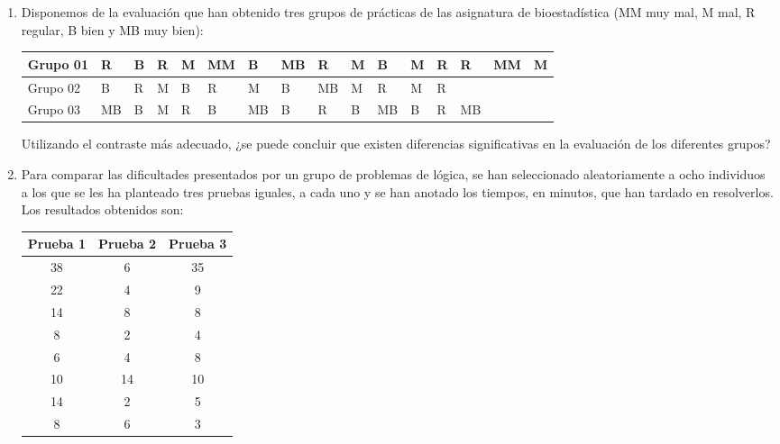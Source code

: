 \begin{description}
\begin{enumerate}[leftmargin=*]
\begin{enumerate}
\item Disponemos de la evaluación que han obtenido tres grupos de prácticas de las asignatura de bioestadística (MM muy mal, M mal, R regular, B bien y MB muy bien):

\begin{center}
\begin{tabular}{|l|l|l|l|l|l|l|l|l|l|l|l|l|l|l|l|}
\hline
Grupo 01 & R & B & R & M & MM & B & MB & R & M & B & M & R & R & MM & M\\
\hline
Grupo 02 & B & R & M & B & R & M & B & MB & M & R & M & R & & &  \\
\hline
Grupo 03 & MB & B & M & R & B & MB & B & R & B & MB & B & R & MB & &  \\
\hline
\end{tabular}
\end{center}

Utilizando el contraste más adecuado, ¿se puede concluir que existen diferencias significativas en la evaluación de los diferentes grupos?


\item Para comparar las dificultades presentados por un grupo de problemas de lógica, se han seleccionado aleatoriamente a ocho individuos a los que se les ha planteado tres pruebas iguales, a cada uno y se han anotado los tiempos, en minutos, que han tardado en resolverlos. Los resultados obtenidos son:

\begin{center}
\begin{tabular}{|l|l|l|}
\hline
\multicolumn{1}{|c|}{Prueba 1} & \multicolumn{1}{c|}{Prueba 2} & \multicolumn{1}{c|}{Prueba 3} \\
\hline
\multicolumn{1}{|c|}{38} & \multicolumn{1}{c|}{6} & \multicolumn{1}{c|}{35} \\
\hline
\multicolumn{1}{|c|}{22} & \multicolumn{1}{c|}{4} & \multicolumn{1}{c|}{9} \\
\hline
\multicolumn{1}{|c|}{14} & \multicolumn{1}{c|}{8} & \multicolumn{1}{c|}{8} \\
\hline
\multicolumn{1}{|c|}{8} & \multicolumn{1}{c|}{2} & \multicolumn{1}{c|}{4} \\
\hline
\multicolumn{1}{|c|}{6} & \multicolumn{1}{c|}{4} & \multicolumn{1}{c|}{8} \\
\hline
\multicolumn{1}{|c|}{10} & \multicolumn{1}{c|}{14} & \multicolumn{1}{c|}{10} \\
\hline
\multicolumn{1}{|c|}{14} & \multicolumn{1}{c|}{2} & \multicolumn{1}{c|}{5} \\
\hline
\multicolumn{1}{|c|}{8} & \multicolumn{1}{c|}{6} & \multicolumn{1}{c|}{3} \\
\hline
\end{tabular}
\end{center}


\end{enumerate}
\end{enumerate}
\end{description}
